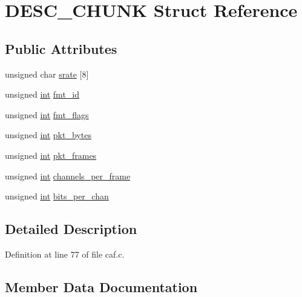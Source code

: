 \hypertarget{struct_d_e_s_c___c_h_u_n_k}{}\section{D\+E\+S\+C\+\_\+\+C\+H\+U\+NK Struct Reference}
\label{struct_d_e_s_c___c_h_u_n_k}
\subsection*{Public Attributes}
\begin{DoxyCompactItemize}
\item 
unsigned char \hyperlink{struct_d_e_s_c___c_h_u_n_k_ad90f5476bc9ef74c2cc94d553e32b7b6}{srate} \mbox{[}8\mbox{]}
\item 
unsigned \hyperlink{xmltok_8h_a5a0d4a5641ce434f1d23533f2b2e6653}{int} \hyperlink{struct_d_e_s_c___c_h_u_n_k_ad1c40e858aef37d2e4eebf7db7a47bc1}{fmt\+\_\+id}
\item 
unsigned \hyperlink{xmltok_8h_a5a0d4a5641ce434f1d23533f2b2e6653}{int} \hyperlink{struct_d_e_s_c___c_h_u_n_k_aee7da3fdf0b72a282cceda4930fe08e4}{fmt\+\_\+flags}
\item 
unsigned \hyperlink{xmltok_8h_a5a0d4a5641ce434f1d23533f2b2e6653}{int} \hyperlink{struct_d_e_s_c___c_h_u_n_k_a757e6726426c6d057dc4477ee799ce1d}{pkt\+\_\+bytes}
\item 
unsigned \hyperlink{xmltok_8h_a5a0d4a5641ce434f1d23533f2b2e6653}{int} \hyperlink{struct_d_e_s_c___c_h_u_n_k_a9fe0397dae15adae8e14e098a908ce4f}{pkt\+\_\+frames}
\item 
unsigned \hyperlink{xmltok_8h_a5a0d4a5641ce434f1d23533f2b2e6653}{int} \hyperlink{struct_d_e_s_c___c_h_u_n_k_a2d7c4f6b04f9de87cf6e1331a8e5322c}{channels\+\_\+per\+\_\+frame}
\item 
unsigned \hyperlink{xmltok_8h_a5a0d4a5641ce434f1d23533f2b2e6653}{int} \hyperlink{struct_d_e_s_c___c_h_u_n_k_a6b223bee56f5fb26f69018e4487225a1}{bits\+\_\+per\+\_\+chan}
\end{DoxyCompactItemize}


\subsection{Detailed Description}


Definition at line 77 of file caf.\+c.



\subsection{Member Data Documentation}

